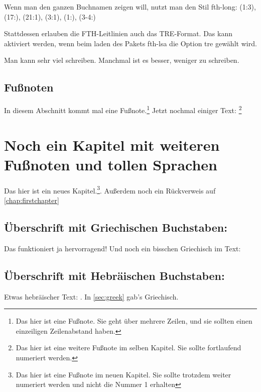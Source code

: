 \documentclass{scrreport}
\begin{document}
Wenn man den ganzen Buchnamen zeigen will, nutzt man den Stil fth-long: { (1:3), (17:), (21:1), (3:1), (1:), (3-4:)}

Stattdessen erlauben die FTH-Leitlinien auch das TRE-Format. Das kann aktiviert werden, wenn beim laden des Pakets fth-lsa die Option tre gewählt wird.


Man kann sehr viel schreiben. Manchmal ist es besser, weniger zu schreiben.

\fussy
\section{Fußnoten}
In diesem Abschnitt kommt mal eine Fußnote.\footnote{Das hier ist eine Fußnote. Sie geht über mehrere Zeilen, und sie sollten einen einzeiligen Zeilenabstand haben. \lipsum[1]} Jetzt nochmal einiger Text: \lipsum[1-9]\footnote{Das hier ist eine weitere Fußnote im selben Kapitel. Sie sollte fortlaufend numeriert werden.}

\chapter{Noch ein Kapitel mit weiteren Fußnoten und tollen Sprachen}
Das hier ist ein neues Kapitel.\footnote{Das hier ist eine Fußnote im neuen Kapitel. Sie sollte trotzdem weiter numeriert werden und nicht die Nummer 1 erhalten}. Außerdem noch ein Rückverweis auf \autoref{chap:firstchapter}

\section{Überschrift mit Griechischen Buchstaben: }
\label{sec:greek}
Das funktioniert ja hervorragend! Und noch ein bisschen Griechisch im Text: 

\section{Überschrift mit Hebräischen Buchstaben: }
Etwas hebräischer Text: . In \autoref{sec:greek} gab's Griechisch.
\end{document}
